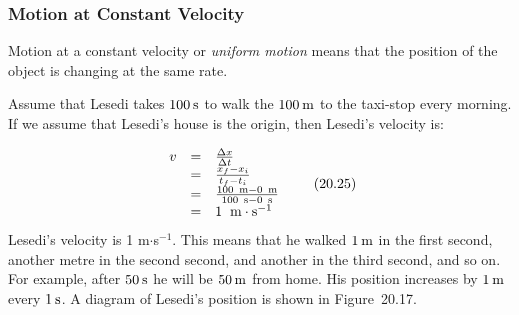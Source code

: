             \subsubsection{ Motion at Constant Velocity}
            \nopagebreak
        \label{m38795*id69835}Motion at a constant velocity or \textsl{uniform motion} means that the position of the object is changing at the same rate.\par 
        \label{m38795*id69845}Assume that Lesedi takes $100\phantom{\rule{2pt}{0ex}}\mathrm{s}$ to walk the $100\phantom{\rule{2pt}{0ex}}\mathrm{m}$ to the taxi-stop every morning. If we assume that Lesedi's house is the origin, then Lesedi's velocity is:\par 
        \label{m38795*id69850}\nopagebreak\noindent{}
          
    \begin{equation}
    \begin{array}{ccc}\hfill v& =& \frac{\Delta x}{\Delta t}\hfill \\ & =& \frac{{x}_{f}-{x}_{i}}{{t}_{f}-{t}_{i}}\hfill \\ & =& \frac{100\phantom{\rule{4pt}{0ex}}\mathrm{m}-0\phantom{\rule{4pt}{0ex}}\mathrm{m}}{100\phantom{\rule{4pt}{0ex}}\mathrm{s}-0\phantom{\rule{4pt}{0ex}}\mathrm{s}}\hfill \\ & =& 1\phantom{\rule{4pt}{0ex}}\phantom{\rule{0.166667em}{0ex}}\mathrm{m}\ensuremath{\cdot}{\mathrm{s}}^{-1}\hfill \end{array}\tag{20.25}
      \end{equation}
        \label{m38795*id70029}Lesedi's velocity is 1 m$\ensuremath{\cdot}$s${}^{-1}$. This means that he walked $1\phantom{\rule{2pt}{0ex}}\mathrm{m}$ in the first second, another metre in the second second, and another in the third second, and so on. For example, after $50\phantom{\rule{2pt}{0ex}}\mathrm{s}$ he will be $50\phantom{\rule{2pt}{0ex}}\mathrm{m}$ from home. His position increases by $1\phantom{\rule{2pt}{0ex}}\mathrm{m}$ every $1\phantom{\rule{2pt}{0ex}}\mathrm{s}$. A diagram of Lesedi's position is shown in Figure~20.17.\par 
    \setcounter{subfigure}{0}
